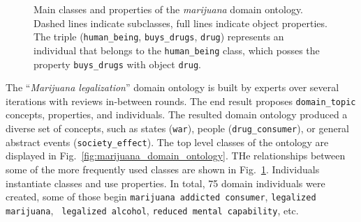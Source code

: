 \begin{figure}
	\centering
	\footnotesize
\caption{Main classes and properties of the \textit{marijuana} domain 
ontology. 
Dashed lines indicate subclasses, full lines indicate object properties. 
The triple (\texttt{human\_being}, \texttt{buys\_drugs}, \texttt{drug}) represents an 
individual that belongs to the
\texttt{human\_being} class, which posses the property \texttt{buys\_drugs} with 
object \texttt{drug}.
} 
\label{fig:main-classes}
\end{figure}

The ``\emph{Marijuana legalization}'' domain ontology is built by experts over
several iterations with reviews in-between rounds. The end result proposes 
\texttt{domain\_topic} concepts, properties, and individuals. The resulted
domain ontology produced a diverse set of concepts, such as states (\texttt{war}),
people (\texttt{drug\_consumer}), or general abstract events (\texttt{society\_effect}). 
The top level classes of the ontology are displayed in 
Fig.~\ref{fig:marijuana_domain_ontology}. THe relationships between some of the more frequently
used classes are shown in Fig.~\ref{fig:main-classes}. 
Individuals instantiate classes
and use properties. In total, 75 domain individuals were created, some of those
begin \texttt{marijuana addicted consumer}, \texttt{legalized marijuana}, \texttt{
legalized alcohol}, \texttt{reduced mental capability}, etc.

